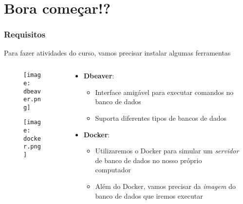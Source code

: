 \documentclass[t, 10pt, aspectratio=169, table, x11names]{beamer}
\begin{document}
	\section{Bora começar!?}

	\begin{frame}
		\frametitle{Requisitos}
		Para fazer atividades do curso, vamos precisar instalar algumas ferramentas
		\begin{columns}[t]
			\begin{column}{0.20\textwidth}
				\vspace{0.3cm}
				\begin{figure}[h]
					\texttt{[image: dbeaver.png]}
				\end{figure}
				\vspace{1.1cm}
				\begin{figure}[h]
					\texttt{[image: docker.png]}
				\end{figure}
			\end{column}

			\begin{column}{0.70\textwidth}
				\begin{itemize}
					\item \textbf{Dbeaver}: \href{https://dbeaver.io/download}{ }
					\begin{itemize}
						\item Interface amigável para executar comandos no banco de dados
						\item Suporta diferentes tipos de bancos de dados
					\end{itemize}

					\vspace{0.4cm}
					\item \textbf{Docker}: \href{https://www.docker.com/products/docker-desktop/}{}
					
					\begin{itemize}
						\item Utilizaremos o Docker para simular um \textit{servidor} de banco de dados no nosso próprio computador
						\item Além do Docker, vamos precisar da \textit{imagem} do banco de dados que iremos executar
					\end{itemize}
				\end{itemize}
			\end{column}
			\begin{column}{0.05\textwidth}
			\end{column}
		\end{columns}
	\end{frame}
\end{document}
